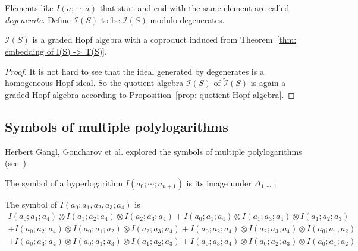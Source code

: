\begin{definition}
Elements like $I(a;\cdots;a)$ that start and end with the same element are called \textit{degenerate}. Define $\mathcal I(S)$ to be $\widetilde{\mathcal I}(S)$ modulo degenerates.
\end{definition}

\begin{proposition}
$\mathcal I(S)$ is a graded Hopf algebra with a coproduct induced from Theorem~\ref{thm: embedding of I(S) -> T(S)}.
\end{proposition}

\begin{proof}
It is not hard to see that the ideal generated by degenerates is a homogeneous Hopf ideal. So the quotient algebra $\mathcal I(S)$ of $\widetilde{\mathcal I}(S)$ is again a graded Hopf algebra according to Proposition~\ref{prop: quotient Hopf algebra}.
\end{proof}

\subsection{Symbols of multiple polylogarithms}\label{sec: symbols of Gangl}

Herbert Gangl, Goncharov et al. explored the symbols of multiple polylogarithms (see~\cite{Gangl_FromPolygonsAndSymbolsToPolylogarithmicFunctions}).

\begin{definition}
The symbol of a hyperlogarithm $I(a_0;\cdots;a_{n+1})$ is its image under $\Delta_{1,\cdots,1}$
\end{definition}

\begin{example}
The symbol of $I(a_0;a_1,a_2,a_3;a_4)$ is
\begin{multline}
I(a_0;a_1;a_4)\otimes I(a_1;a_2;a_4)\otimes I(a_2;a_3;a_4)+I(a_0;a_1;a_4)\otimes I(a_1;a_3;a_4)\otimes I(a_1;a_2;a_3)\\
+I(a_0;a_2;a_4)\otimes I(a_0;a_1;a_2)\otimes I(a_2;a_3;a_4)+I(a_0;a_2;a_4)\otimes I(a_2;a_3;a_4)\otimes I(a_0;a_1;a_2)\\
+I(a_0;a_3;a_4)\otimes I(a_0;a_1;a_3)\otimes I(a_1;a_2;a_3)+I(a_0;a_3;a_4)\otimes I(a_0;a_2;a_3)\otimes I(a_0;a_1;a_2)
\end{multline}
\end{example}

